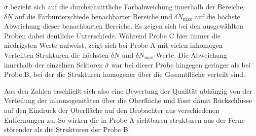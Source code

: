 \documentclass{article}
\begin{document}
$\bar{\sigma}$ bezieht sich auf die durchschnittliche Farbabweichung innerhalb der Bereiche, $\delta N$ auf die Farbunterschiede benachbarter Bereiche und $\delta N_\text{max}$ auf die höchste Abweichung dieser benachbarten Bereiche. Es zeigen sich bei den ausgewählten Proben dabei deutliche Unterschiede. Während Probe C hier immer die niedrigsten Werte aufweist, zeigt sich bei Probe A mit vielen inhomogen Verteilten Strukturen die höchsten $\delta N$ und $\delta N_\text{max}$-Werte. Die Abweichung innerhalb der einzelnen Sektoren $\bar{\sigma}$ war bei dieser Probe hingegen geringer als bei Probe B, bei der die Strukturen homogener über die Gesamtfläche verteilt sind.

Aus den Zahlen erschließt sich also eine Bewertung der Qualität abhängig von der Verteilung der inhomogenitäten über die Oberfläche und lässt damit Rückschlüsse auf den Eindruck der Oberfläche auf den Beobachter aus verschiedenen Entfernungen zu. So wirken die in Probe A sichtbaren strukturen aus der Ferne störender als die Strukturen der Probe B.
\end{document}

